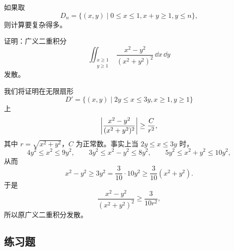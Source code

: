 \begin{xremark}
如果取
\[
  D_n=\{(x,y)\mid0\le x\le1,x+y\ge1,y\le n\},
\]
则计算要复杂得多。
\end{xremark}

\begin{xexample}[22.4.3]
证明：广义二重积分
\[
  \iint_{\substack{x\ge1\\y\ge1}}\frac{x^2-y^2}{(x^2+y^2)^2}\,\dd x\,\dd y
\]
发散。
\end{xexample}
\begin{xproof}
我们将证明在无限扇形
\[
  D'=\{(x,y)\mid2y\le x\le3y,x\ge1,y\ge1\}
\]
上
\[
  \abs*{\frac{x^2-y^2}{(x^2+y^2)^2}}\ge\frac C{r^2},
\]
其中 $r=\sqrt{x^2+y^2}$，$C$ 为正常数。事实上当 $2y\le x\le3y$ 时，
\[
  4y^2\le x^2\le9y^2,\qquad3y^2\le x^2-y^2\le8y^2,\qquad5y^2\le x^2+y^2\le10y^2,
\]
从而
\[
  x^2-y^2\ge3y^2=\frac3{10}\cdot10y^2\ge\frac3{10}(x^2+y^2).
\]
于是
\[
  \frac{x^2-y^2}{(x^2+y^2)^2}\ge\frac3{10r^2},
\]
所以原广义二重积分发散。
\end{xproof}

\subsection{练习题}

